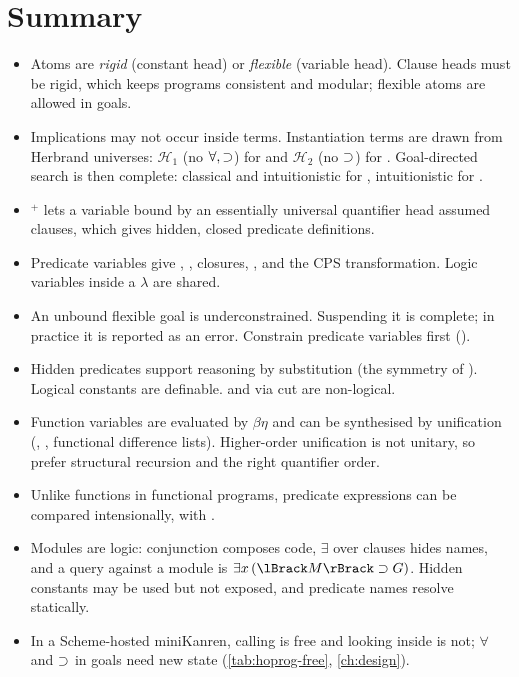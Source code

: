 \section{Summary}\label{sec:hoprog-summary}
\begin{itemize}
\item Atoms are \emph{rigid} (constant head) or \emph{flexible} (variable head). Clause heads must be rigid,
  which keeps programs consistent and modular; flexible atoms are allowed in goals.
\item Implications may not occur inside terms. Instantiation terms are drawn from Herbrand universes:
  $\mathcal{H}_1$ (no $\forall,\supset$) for \hohc{} and $\mathcal{H}_2$ (no $\supset$) for \hohh{}. Goal-directed
  search is then complete: classical and intuitionistic for \hohc{}, intuitionistic for \hohh{}.
\item \hohh$^+$ lets a variable bound by an essentially universal quantifier head assumed clauses, which
  gives hidden, closed predicate definitions.
\item Predicate variables give , , closures, ,  and the CPS
  transformation. Logic variables inside a $\lambda$ are shared.
\item An unbound flexible goal is underconstrained. Suspending it is complete; in practice it is reported
  as an error. Constrain predicate variables first ().
\item Hidden predicates support reasoning by substitution (the symmetry of ). Logical
  constants are definable.  and  via cut are non-logical.
\item Function variables are evaluated by $\beta\eta$ and can be synthesised by unification
  (, , functional difference lists). Higher-order unification is not unitary, so
  prefer structural recursion and the right quantifier order.
\item Unlike functions in functional programs, predicate expressions can be compared
  intensionally, with .
\item Modules are logic: conjunction composes code, $\exists$ over clauses hides\linebreak{} names, and a query
  against a module is $\exists x\,(\hoprogT{M}\imp G)$. Hidden constants may be used but not exposed, and
  predicate names resolve statically.
\item In a Scheme-hosted miniKanren, calling is free and looking inside is not; $\forall$ and $\supset$ in
  goals need new state (\cref{tab:hoprog-free}, \cref{ch:design}).
\end{itemize}
